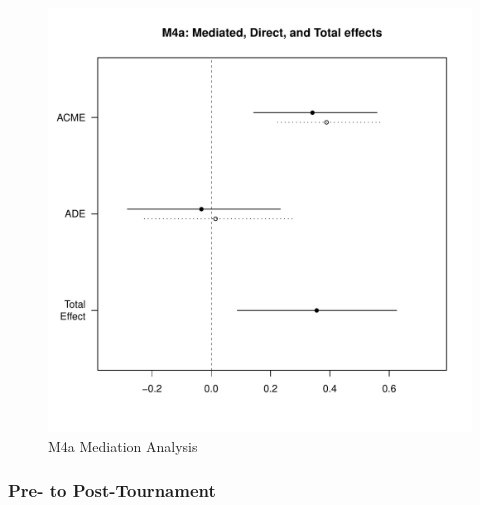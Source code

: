          \begin{figure}[htbp]
           \centering
           \includegraphics[scale = .5]{images/MLM4aMediationEffects.pdf}
           \caption{M4a Mediation Analysis}
           \label{fig:MLM4aMediationAnalysis}
         \end{figure}



      \subsubsection{Pre- to Post-Tournament}

